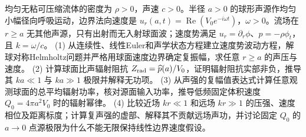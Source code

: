 均匀无粘可压缩流体的密度为 \(\rho>0\)，声速 \(c>0\)。半径 \(a>0\) 的球形声源作均匀小幅径向呼吸运动，边界法向速度是 \(u_r(a,t)=\operatorname{Re}(V_0e^{-i\omega t})\)，\(\omega>0\)。流场在 \(r\ge a\) 无其他声源，只有出射而无入射球面波；速度势满足 \(u_r=\partial_r\phi\)、\(p=-\rho\phi_t\)，且 \(k=\omega/c\)。
(1) 从连续性、线性Euler和声学状态方程建立速度势波动方程，解球对称Helmholtz问题并严格用球面速度边界确定复振幅，求任意 \(r\ge a\) 的声压与速度。
(2) 计算球面比声辐射阻抗 \(Z_{\rm rad}=\widehat p(a)/V_0\)，证明辐射阻抗实部非负，推导其 \(ka\ll1\) 与 \(ka\gg1\) 极限并解释无功项。
(3) 从声强的复幅值表达式计算任意观测球面的总平均辐射功率，核对源面输入功率，推导低频固定体积速度 \(Q_0=4\pi a^2V_0\) 时的辐射幂律。
(4) 比较近场 \(kr\ll1\) 和远场 \(kr\gg1\) 的压强、速度相位及距离标度；计算复声强的虚部、解释其不贡献远场声功，并讨论固定 \(Q_0\) 的 \(a\to0\) 点源极限为什么不能无限保持线性边界速度假设。
